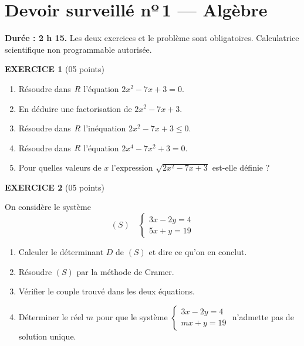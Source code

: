\chapter*{Devoir surveillé nº\,1 — Algèbre}

\begin{devoirsurveille}
\textbf{Durée : 2 h 15.} Les deux exercices et le problème sont obligatoires.
Calculatrice scientifique non programmable autorisée.

\vspace{0.7em}
\noindent\textbf{\sffamily EXERCICE 1} \hfill \textup{(05 points)}

\begin{enumerate}[label=\textbf{\arabic*.}, leftmargin=*, itemsep=0.25em]
  \item Résoudre dans $R$ l'équation $2x^{2}-7x+3 = 0$. 
  \item En déduire une factorisation de $2x^{2}-7x+3$. 
  \item Résoudre dans $R$ l'inéquation $2x^{2}-7x+3 \leq 0$. 
  \item Résoudre dans $R$ l'équation $2x^{4}-7x^{2}+3 = 0$.
  \item Pour quelles valeurs de $x$ l'expression
        $\sqrt{2x^{2}-7x+3}$ est-elle définie ? 
\end{enumerate}

\vspace{0.7em}
\noindent\textbf{\sffamily EXERCICE 2} \hfill \textup{(05 points)}

On considère le système
\[
  (S) \quad \begin{cases} 3x-2y = 4\\ 5x+y = 19 \end{cases}
\]

\begin{enumerate}[label=\textbf{\arabic*.}, leftmargin=*, itemsep=0.25em]
  \item Calculer le déterminant $D$ de $(S)$ et dire ce qu'on en conclut.
  \item Résoudre $(S)$ par la méthode de Cramer. 
  \item Vérifier le couple trouvé dans les deux équations. 
  \item Déterminer le réel $m$ pour que le système
        $\begin{cases} 3x-2y = 4\\ mx+y = 19\end{cases}$
        n'admette pas de solution unique. 
\end{enumerate}


\end{devoirsurveille}
